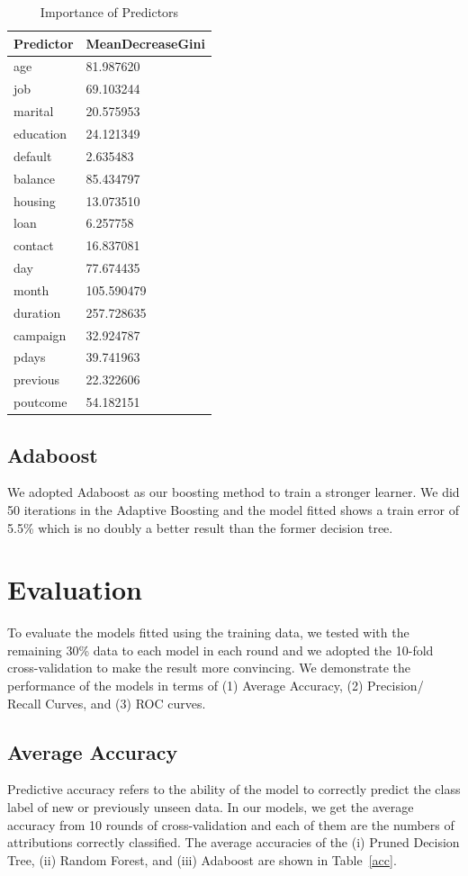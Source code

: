 \documentclass[letter]{article}
\begin{document}
\begin{table}[!htbp]
\centering
\caption{Importance of Predictors}\label{imp}
\begin{tabular}{ll}
\hline
\hline
Predictor &MeanDecreaseGini\\
  \hline
age         &     81.987620\\
job          &    69.103244\\
marital      &    20.575953\\
education    &    24.121349\\
default      &     2.635483\\
balance      &    85.434797\\
housing      &    13.073510\\
loan         &     6.257758\\
contact      &    16.837081\\
day          &    77.674435\\
month        &   105.590479\\
duration     &   257.728635\\
campaign     &    32.924787\\
pdays        &    39.741963\\
previous     &    22.322606\\
poutcome     &    54.182151\\
\hline
\hline
\end{tabular}
\end{table}

\subsection{Adaboost}
We adopted Adaboost as our boosting method to train a stronger learner. We 
did 50 iterations in the Adaptive Boosting and the model fitted shows a train
error of 5.5\% which is no doubly a better result than the former decision
tree.

\section{Evaluation}
To evaluate the models fitted using the training data, we tested with the
remaining 30\% data to each model in each round and we adopted the 10-fold 
cross-validation to make the result more convincing.  We demonstrate the
 performance of the models in terms of (1) Average Accuracy, (2) Precision/
 Recall Curves, and (3) ROC curves.

\subsection{Average Accuracy}
Predictive accuracy refers to the ability of the model to correctly predict
the class label of new or previously unseen data. In our models, we get the
average accuracy from 10 rounds of cross-validation and each of them are the
numbers of attributions correctly classified. The average accuracies of the 
(i) Pruned Decision Tree, (ii) Random Forest, and (iii) Adaboost are shown
in Table~\ref{acc}.
\end{document}
